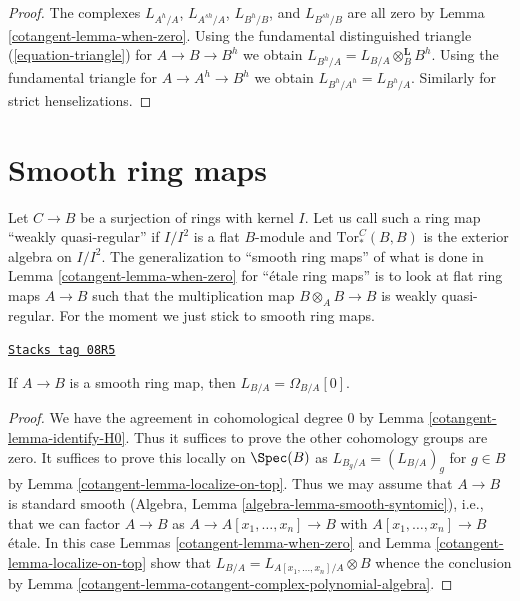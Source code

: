 \begin{proof}

The complexes $L_{A^h/A}$, $L_{A^{sh}/A}$, $L_{B^h/B}$, and
$L_{B^{sh}/B}$ are all zero by Lemma \ref{cotangent-lemma-when-zero}.
Using the fundamental distinguished triangle (\ref{equation-triangle})
for $A \to B \to B^h$ we obtain
$L_{B^h/A} = L_{B/A} \otimes_B^\mathbf{L} B^h$.
Using the fundamental triangle for $A \to A^h \to B^h$
we obtain $L_{B^h/A^h} = L_{B^h/A}$.
Similarly for strict henselizations.
\end{proof}

\section{Smooth ring maps}
\label{cotangent-section-smooth}
Let $C \to B$ be a surjection of rings with kernel $I$. Let us call such
a ring map ``weakly quasi-regular'' if $I/I^2$ is a flat $B$-module and
$\text{Tor}_*^C(B, B)$ is the exterior algebra on $I/I^2$.
The generalization to ``smooth ring maps'' of what is done in
Lemma \ref{cotangent-lemma-when-zero} for ``\'etale ring maps'' is to look
at flat ring maps $A \to B$ such that the multiplication map
$B \otimes_A B \to B$ is weakly quasi-regular. For the moment we just stick to
smooth ring maps.

\begin{lemma}
\label{cotangent-lemma-when-projective}
\href{https://stacks.math.columbia.edu/tag/08R5}{\texttt{Stacks tag 08R5}}

If $A \to B$ is a smooth ring map, then $L_{B/A} = \Omega_{B/A}[0]$.
\end{lemma}

\begin{proof}

We have the agreement in cohomological degree $0$ by
Lemma \ref{cotangent-lemma-identify-H0}.
Thus it suffices to prove the other cohomology groups
are zero. It suffices to prove this locally on $\Spec(B)$ as
$L_{B_g/A} = (L_{B/A})_g$ for $g \in B$ by Lemma \ref{cotangent-lemma-localize-on-top}.
Thus we may assume that $A \to B$ is standard smooth
(Algebra, Lemma \ref{algebra-lemma-smooth-syntomic}), i.e.,
that we can factor $A \to B$ as
$A \to A[x_1, \ldots, x_n] \to B$ with $A[x_1, \ldots, x_n] \to B$
\'etale. In this case Lemmas \ref{cotangent-lemma-when-zero} and
Lemma \ref{cotangent-lemma-localize-on-top} show that
$L_{B/A} = L_{A[x_1, \ldots, x_n]/A} \otimes B$
whence the conclusion by
Lemma \ref{cotangent-lemma-cotangent-complex-polynomial-algebra}.
\end{proof}

